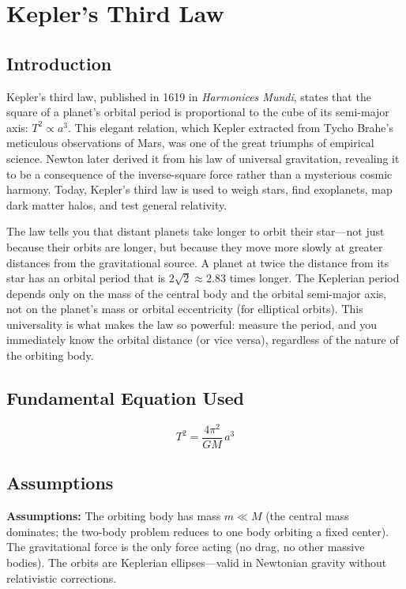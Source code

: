 \chapter{Kepler's Third Law}

\section*{Introduction}

Kepler's third law, published in 1619 in \textit{Harmonices Mundi}, states that the square of a planet's orbital period is proportional to the cube of its semi-major axis: $T^2 \propto a^3$. This elegant relation, which Kepler extracted from Tycho Brahe's meticulous observations of Mars, was one of the great triumphs of empirical science. Newton later derived it from his law of universal gravitation, revealing it to be a consequence of the inverse-square force rather than a mysterious cosmic harmony. Today, Kepler's third law is used to weigh stars, find exoplanets, map dark matter halos, and test general relativity.

The law tells you that distant planets take longer to orbit their star---not just because their orbits are longer, but because they move more slowly at greater distances from the gravitational source. A planet at twice the distance from its star has an orbital period that is $2\sqrt{2} \approx 2.83$ times longer. The Keplerian period depends only on the mass of the central body and the orbital semi-major axis, not on the planet's mass or orbital eccentricity (for elliptical orbits). This universality is what makes the law so powerful: measure the period, and you immediately know the orbital distance (or vice versa), regardless of the nature of the orbiting body.
\section*{Fundamental Equation Used}

\begin{equation}
T^2 = \frac{4\pi^2}{GM}\,a^3
\end{equation}
\section*{Assumptions}

\textbf{Assumptions:} The orbiting body has mass $m \ll M$ (the central mass dominates; the two-body problem reduces to one body orbiting a fixed center). The gravitational force is the only force acting (no drag, no other massive bodies). The orbits are Keplerian ellipses---valid in Newtonian gravity without relativistic corrections.



